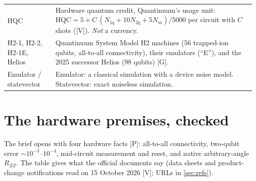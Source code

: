 \documentclass[11pt,a4paper]{article}
\newcommand{\HQC}{\mathrm{HQC}}
\newcommand{\lP}{\textcolor{keyblue}{[P]}}   %
\newcommand{\lV}{\textcolor{keyblue}{[V]}}   %
\newcommand{\lG}{\textcolor{alertred}{[G]}}  %
\begin{document}
\begin{center}
\begin{tabularx}{\linewidth}{@{}L{3.4cm}Y@{}}
HQC & Hardware quantum credit, Quantinuum's usage unit: $\HQC=5+C\,(N_{1q}+10N_{2q}+5N_m)/5000$ per circuit with $C$ shots (\lV). \emph{Not} a currency.\\
H2-1, H2-2, H2-1E, Helios & Quantinuum System Model H2 machines (56 trapped-ion qubits, all-to-all connectivity), their emulators (``E''), and the 2025 successor Helios (98 qubits) \lG.\\
Emulator / statevector & Emulator: a classical simulation with a device noise model. Statevector: exact noiseless simulation.\\
\bottomrule
\end{tabularx}
\end{center}

\section{The hardware premises, checked}\label{sec:hardware}
The brief opens with four hardware facts \lP: all-to-all connectivity, two-qubit error $\sim10^{-3}$--$10^{-4}$, mid-circuit measurement and reset, and native arbitrary-angle $R_{ZZ}$. The table gives what the official documents say (data sheets and product-change notifications read on 15 October 2026 \lV; URLs in \cref{sec:refs}).
\end{document}
